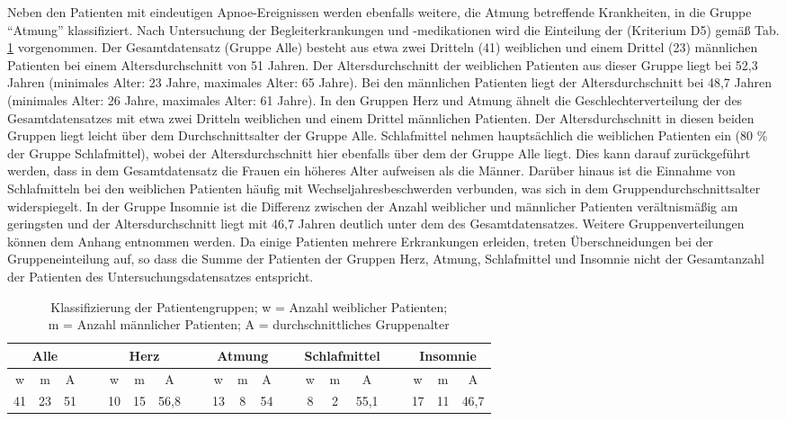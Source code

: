 Neben den Patienten mit eindeutigen Apnoe-Ereignissen werden ebenfalls weitere, die Atmung betreffende Krankheiten, in die Gruppe "`Atmung"' klassifiziert. Nach Untersuchung der Begleiterkrankungen und -medikationen wird die Einteilung der (Kriterium D5) gemäß Tab. \ref{tab:gruppen} vorgenommen. Der Gesamtdatensatz (Gruppe Alle) besteht aus etwa zwei Dritteln (41) weiblichen und einem Drittel (23) männlichen Patienten bei einem Altersdurchschnitt von 51 Jahren. Der Altersdurchschnitt der weiblichen Patienten aus dieser Gruppe liegt bei 52,3 Jahren (minimales Alter: 23 Jahre, maximales Alter: 65 Jahre). Bei den männlichen Patienten liegt der Altersdurchschnitt bei 48,7 Jahren (minimales Alter: 26 Jahre, maximales Alter: 61 Jahre). In den Gruppen Herz und Atmung ähnelt die Geschlechterverteilung der des Gesamtdatensatzes mit etwa zwei Dritteln weiblichen und einem Drittel männlichen Patienten. Der Altersdurchschnitt in diesen beiden Gruppen liegt leicht über dem Durchschnittsalter der Gruppe Alle. Schlafmittel nehmen hauptsächlich die weiblichen Patienten ein (80 \% der Gruppe Schlafmittel), wobei der Altersdurchschnitt hier ebenfalls über dem der Gruppe Alle liegt. Dies kann darauf zurückgeführt werden, dass in dem Gesamtdatensatz die Frauen ein höheres Alter aufweisen als die Männer. Darüber hinaus ist die Einnahme von Schlafmitteln bei den weiblichen Patienten häufig mit Wechseljahresbeschwerden verbunden, was sich in dem Gruppendurchschnittsalter widerspiegelt. In der Gruppe Insomnie ist die Differenz zwischen der Anzahl weiblicher und männlicher Patienten verältnismäßig am geringsten und der Altersdurchschnitt liegt mit 46,7 Jahren deutlich unter dem des Gesamtdatensatzes. Weitere Gruppenverteilungen können dem Anhang entnommen werden. Da einige Patienten mehrere Erkrankungen erleiden, treten Überschneidungen bei der Gruppeneinteilung auf, so dass die Summe der Patienten der Gruppen Herz, Atmung, Schlafmittel und Insomnie nicht der Gesamtanzahl der Patienten des Untersuchungsdatensatzes entspricht.\\

\begin{table}[H] 
\centering
\begin{tabularx}{\textwidth}{ccccccccccccccccccc}
\toprule
\multicolumn{3}{c}{\textbf{Alle}} & &  \multicolumn{3}{c}{\textbf{Herz}} & &  \multicolumn{3}{c}{\textbf{Atmung}} & &  \multicolumn{3}{c}{\textbf{Schlafmittel}} & &  \multicolumn{3}{c}{\textbf{Insomnie}}\\  
\midrule
w  & m  & A  &   & w  & m  & A    &   & w  & m & A  &   & w & m & A    &   & w  & m  & A\\
41 & 23 & 51 & ~ & 10 & 15 & 56,8 & ~ & 13 & 8 & 54 & ~ & 8 & 2 & 55,1 & ~ & 17 & 11 & 46,7\\
\bottomrule
\end{tabularx}
\caption[Klassifizierung der Patientengruppen]{Klassifizierung der Patientengruppen; w = Anzahl weiblicher Patienten;\\m = Anzahl männlicher Patienten; A = durchschnittliches Gruppenalter}
\label{tab:gruppen}
\end{table}



